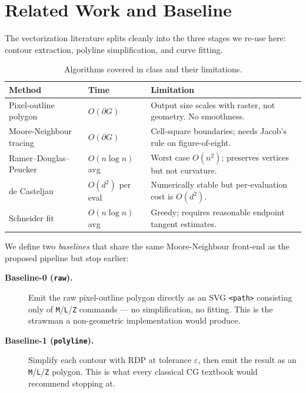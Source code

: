 \documentclass[twocolumn,a4paper,10pt]{article}
\begin{document}
\section{Related Work and Baseline}
\label{sec:related}

The vectorization literature splits cleanly into the three stages we
re-use here: contour extraction, polyline simplification, and curve
fitting.

\begin{table}[h]
\caption{Algorithms covered in class and their limitations.}
\label{tab:related}
\centering
\begin{tabular}{@{}p{}p{}p{}@{}}
\toprule
\textbf{Method} & \textbf{Time} & \textbf{Limitation} \\ \midrule
Pixel-outline polygon
   & $O(\partial G)$
   & Output size scales with raster, not geometry.  No smoothness. \\
Moore-Neighbour tracing~\cite{gonzalez}
   & $O(\partial G)$
   & Cell-square boundaries; needs Jacob's rule on figure-of-eight. \\
Ramer--Douglas--Peucker~\cite{douglas1973}
   & $O(n\log n)$ avg
   & Worst case $O(n^2)$; preserves vertices but not curvature. \\
de Casteljau~\cite{decasteljau,farouki2012}
   & $O(d^2)$ per eval
   & Numerically stable but per-evaluation cost is $O(d^2)$. \\
Schneider fit~\cite{schneider1990}
   & $O(n\log n)$ avg
   & Greedy; requires reasonable endpoint tangent estimates. \\ \bottomrule
\end{tabular}
\end{table}

We define two \emph{baselines} that share the same Moore-Neighbour
front-end as the proposed pipeline but stop earlier:

\begin{description}
\item[\textbf{Baseline-0 (\texttt{raw}).}]  Emit the raw pixel-outline
  polygon directly as an SVG \texttt{<path>} consisting only of
  \texttt{M}/\texttt{L}/\texttt{Z} commands --- no simplification, no
  fitting.  This is the strawman a non-geometric implementation would
  produce.
\item[\textbf{Baseline-1 (\texttt{polyline}).}]  Simplify each contour
  with RDP at tolerance $\varepsilon$, then emit the result as an
  \texttt{M}/\texttt{L}/\texttt{Z} polygon.  This is what every
  classical CG textbook would recommend stopping at.
\end{description}
\end{document}
